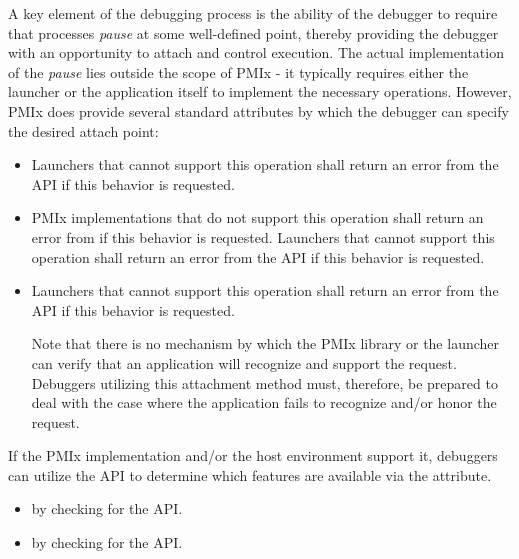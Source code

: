 A key element of the debugging process is the ability of the debugger to require that processes \emph{pause} at some well-defined point, thereby providing the debugger with an opportunity to attach and control execution. The actual implementation of the \emph{pause} lies outside the scope of \ac{PMIx} - it typically requires either the launcher or the application itself to implement the necessary operations. However, \ac{PMIx} does provide several standard attributes by which the debugger can specify the desired attach point:

\begin{itemize}
    \item {}Launchers that cannot support this operation shall return an error from the  \ac{API} if this behavior is requested.
    \pasteAttributeItemEnd{}
    \item {}\ac{PMIx} implementations that do not support this operation shall return an error from  if this behavior is requested. Launchers that cannot support this operation shall return an error from the  \ac{API} if this behavior is requested.
    \pasteAttributeItemEnd{}
    \item {}Launchers that cannot support this operation shall return an error from the  \ac{API} if this behavior is requested.

    Note that there is no mechanism by which the \ac{PMIx} library or the launcher can verify that an application will recognize and support the  request. Debuggers utilizing this attachment method must, therefore, be prepared to deal with the case where the application fails to recognize and/or honor the request.
    \pasteAttributeItemEnd{}
\end{itemize}

If the \ac{PMIx} implementation and/or the host environment support it, debuggers can utilize the  \ac{API} to determine which features are available via the  attribute.

\begin{itemize}
    \item {} by checking  for the  \ac{API}.
    \item {} by checking  for the  \ac{API}.
\end{itemize}

